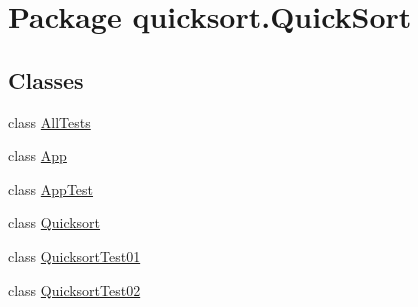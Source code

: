 \hypertarget{namespacequicksort_1_1_quick_sort}{}\section{Package quicksort.\+Quick\+Sort}
\label{namespacequicksort_1_1_quick_sort}
\subsection*{Classes}
\begin{DoxyCompactItemize}
\item 
class \hyperlink{classquicksort_1_1_quick_sort_1_1_all_tests}{All\+Tests}
\item 
class \hyperlink{classquicksort_1_1_quick_sort_1_1_app}{App}
\item 
class \hyperlink{classquicksort_1_1_quick_sort_1_1_app_test}{App\+Test}
\item 
class \hyperlink{classquicksort_1_1_quick_sort_1_1_quicksort}{Quicksort}
\item 
class \hyperlink{classquicksort_1_1_quick_sort_1_1_quicksort_test01}{Quicksort\+Test01}
\item 
class \hyperlink{classquicksort_1_1_quick_sort_1_1_quicksort_test02}{Quicksort\+Test02}
\end{DoxyCompactItemize}
